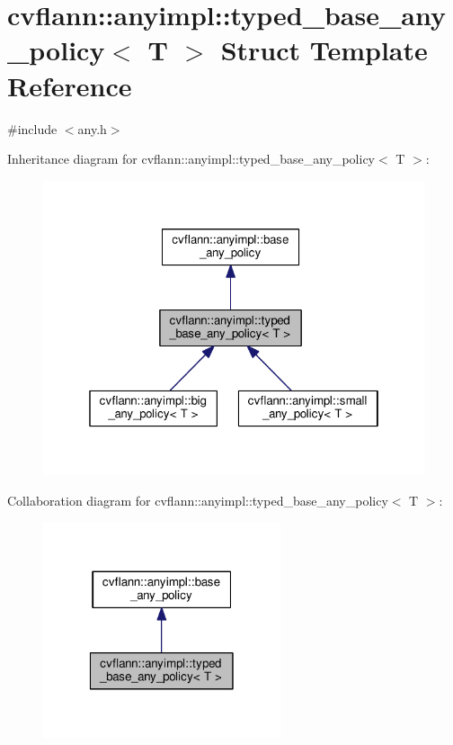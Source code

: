 \hypertarget{structcvflann_1_1anyimpl_1_1typed__base__any__policy}{\section{cvflann\-:\-:anyimpl\-:\-:typed\-\_\-base\-\_\-any\-\_\-policy$<$ T $>$ Struct Template Reference}
\label{structcvflann_1_1anyimpl_1_1typed__base__any__policy}
}


{\ttfamily \#include $<$any.\-h$>$}



Inheritance diagram for cvflann\-:\-:anyimpl\-:\-:typed\-\_\-base\-\_\-any\-\_\-policy$<$ T $>$\-:\nopagebreak
\begin{figure}[H]
\begin{center}
\leavevmode
\includegraphics[width=321pt]{structcvflann_1_1anyimpl_1_1typed__base__any__policy__inherit__graph}
\end{center}
\end{figure}


Collaboration diagram for cvflann\-:\-:anyimpl\-:\-:typed\-\_\-base\-\_\-any\-\_\-policy$<$ T $>$\-:\nopagebreak
\begin{figure}[H]
\begin{center}
\leavevmode
\includegraphics[width=198pt]{structcvflann_1_1anyimpl_1_1typed__base__any__policy__coll__graph}
\end{center}
\end{figure}
